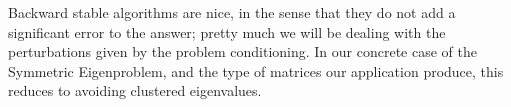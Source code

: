 Backward stable algorithms are
nice, in the sense that they do not add 
a significant error to the answer; pretty much we will be dealing with
the perturbations given by the problem conditioning. In our concrete
case of the Symmetric Eigenproblem, and the type of matrices our
application produce, this reduces to avoiding clustered
eigenvalues. 

